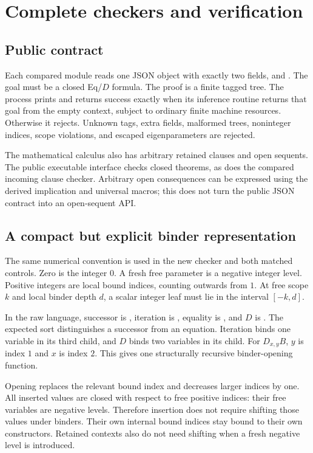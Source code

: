\section{Complete checkers and verification}
\label{sec:implementation}

\subsection{Public contract}

Each compared module reads one JSON object with exactly two fields,
 and . The goal must be a closed Eq/$D$ formula.
The proof is a finite tagged tree. The process prints  and
returns success exactly when its inference routine returns that goal
from the empty context, subject to ordinary finite machine resources.
Otherwise it rejects. Unknown tags, extra fields, malformed trees,
noninteger indices, scope violations, and escaped eigenparameters are
rejected.

The mathematical calculus also has arbitrary retained clauses and open
sequents. The public executable interface checks closed theorems, as
does the compared incoming clause checker. Arbitrary open consequences
can be expressed using the derived implication and universal macros;
this does not turn the public JSON contract into an open-sequent API.

\subsection{A compact but explicit binder representation}

The same numerical convention is used in the new checker and both
matched controls. Zero is the integer $0$. A fresh free parameter is a
negative integer level. Positive integers are local bound indices,
counting outwards from $1$. At free scope $k$ and local binder depth $d$,
a scalar integer leaf must lie in the interval $[-k,d]$.

In the raw language, successor is \code{[0,t]}, iteration is
\code{[n,a,h]}, equality is \code{[s,t]}, and $D$ is \code{[B]}.
The expected sort distinguishes a successor from an equation.
Iteration binds one variable in its third child, and $D$ binds two
variables in its child. For $D_{x,y}B$, $y$ is index $1$ and $x$ is
index $2$. This gives one structurally recursive binder-opening function.

Opening replaces the relevant bound index and decreases larger indices
by one. All inserted values are closed with respect to free positive
indices: their free variables are negative levels. Therefore insertion
does not require shifting those values under binders. Their own internal
bound indices stay bound to their own constructors. Retained contexts
also do not need shifting when a fresh negative level is introduced.

